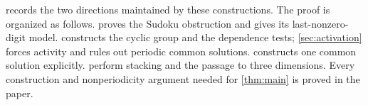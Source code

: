  records the two directions maintained by these
constructions. The proof is organized as follows.   proves the Sudoku
obstruction and gives its last-nonzero-digit model.
 constructs the cyclic group and the dependence tests;
\cref{sec:activation} forces activity and rules out periodic common
solutions.   constructs one common solution explicitly.
 perform stacking and the passage to three
dimensions.  Every construction and nonperiodicity argument needed for
\cref{thm:main} is proved in the paper.


